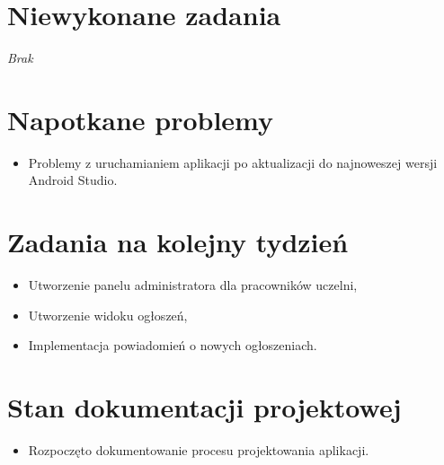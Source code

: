 \documentclass[12pt,a4paper]{mwart}
\begin{document}
\section{Niewykonane zadania}
\textit{Brak}

\section{Napotkane problemy}

\begin{itemize}
	\item Problemy z uruchamianiem aplikacji po aktualizacji do najnoweszej wersji Android Studio.
\end{itemize}

\section{Zadania na kolejny tydzień}
\begin{itemize}
	\item Utworzenie panelu administratora dla pracowników uczelni,
	\item Utworzenie widoku ogłoszeń,
	\item Implementacja powiadomień o nowych ogłoszeniach.
\end{itemize}

\section{Stan dokumentacji projektowej}
\begin{itemize}
	\item Rozpoczęto dokumentowanie procesu projektowania aplikacji.
\end{itemize}
\end{document}
